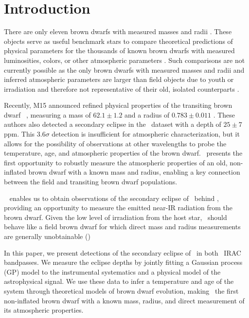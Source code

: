 

\section{Introduction}
\label{sec:intro}

There are only
eleven brown dwarfs with measured 
masses and radii \citep[hereafter M15, and references therein]{Montet15a}.
These objects serve as useful benchmark stars to compare theoretical 
predictions of physical parameters for the thousands of known brown dwarfs with
measured luminosities, colors, or other atmospheric parameters 
\citep{Faherty13, Mace13, Helling14}.
Such comparisons are not currently possible as the only brown dwarfs with measured
masses and radii and inferred atmospheric parameters are larger than field objects 
due to youth or irradiation
and therefore not representative of their old, isolated counterparts 
\citep{Stassun06, Siverd12}.


Recently, M15 announced refined physical properties of the transiting
brown dwarf \LC\ \citep{Johnson11a}, measuring a mass of $62.1 \pm 1.2$ \mjup{} and a radius of 
$0.783 \pm 0.011$ \rjup. These authors also detected a secondary eclipse in the
\itk\ dataset with a depth of $25 \pm 7$ ppm.
This $3.6 \sigma$ detection is insufficient for atmospheric characterization,
but it allows for the possibility of observations at other 
wavelengths to probe the temperature, age, and atmospheric properties of the 
brown dwarf.
\LC\ presents the first opportunity to robustly measure the
atmospheric properties of an old, non-inflated brown dwarf with a known mass
and radius, enabling a key connection between the field and transiting 
brown dwarf populations.


\spitz\ \citep{Werner04} enables us to obtain observations of the secondary eclipse of
\LC\ behind \LA, providing an opportunity to measure the emitted 
near-IR radiation from the brown dwarf. 
Given the low level of irradiation from the host star, \LC\ should behave 
like a field brown dwarf for which direct mass and radius measurements 
are generally unobtainable ()

In this paper, we present detections of the secondary eclipse of \LC\ in both
 \spitz\ IRAC bandpasses.
We measure the eclipse depths by jointly fitting a Gaussian process (GP) model
to the instrumental systematics and a physical model of the astrophysical
signal.
We use these data to infer a temperature and age of the system through 
theoretical models of brown dwarf evolution, making \LC\ the first 
non-inflated brown dwarf with a known mass, radius, and direct measurement
of its atmospheric properties. 


